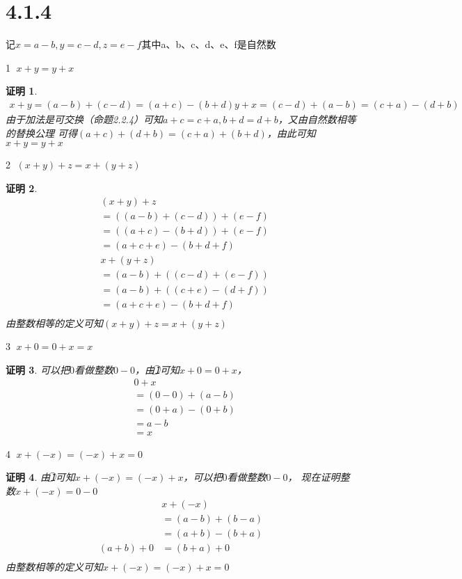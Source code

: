 \documentclass{article}
\theoremstyle{mystyle}
\theoremstyle{zproofstyle}
\newtheorem*{zproof}{证明}
\begin{document}
\section*{4.1.4}
记$x = a - b, y = c - d, z = e - f$其中a、b、c、d、e、f是自然数

\textcircled{1} $x + y = y + x$

\begin{zproof}
  \begin{align*}
    x + y
    = (a-b)+(c-d)
    = (a+c) - (b+d)
    y + x
    =(c-d)+(a-b)
    =(c+a) - (d+b)
  \end{align*}
  由于加法是可交换（命题2.2.4）可知$a+c=c+a,b+d=d+b$，又由自然数相等的替换公理
  可得$(a+c) + (d+b) = (c+a) + (b+d)$，由此可知$x + y = y + x$
\end{zproof}

\textcircled{2} $(x+y)+z=x+(y+z)$

\begin{zproof}
  \begin{align*}
     & (x+y)+z               \\
     & = ((a-b)+(c-d))+(e-f) \\
     & = ((a+c)-(b+d))+(e-f) \\
     & = (a+c+e) - (b+d+f)   \\
     & x+(y+z)               \\
     & = (a-b)+((c-d)+(e-f)) \\
     & = (a-b)+((c+e)-(d+f)) \\
     & = (a+c+e) - (b+d+f)   \\
  \end{align*}
  由整数相等的定义可知$(x+y)+z=x+(y+z)$

\end{zproof}

\textcircled{3} $x+0=0+x=x$

\begin{zproof}
  可以把$0$看做整数$0-0$，由\textcircled{1}可知$x+0=0+x$，
  \begin{align*}
     & 0+x           \\
     & = (0-0)+(a-b) \\
     & = (0+a)-(0+b) \\
     & = a-b         \\
     & = x
  \end{align*}
\end{zproof}

\textcircled{4} $x+(-x)=(-x)+x=0$

\begin{zproof}
  由\textcircled{1}可知$x+(-x)=(-x)+x$，可以把$0$看做整数$0-0$，
  现在证明整数$x+(-x)=0-0$
  \begin{align*}
              & x + (-x)        \\
              & = (a-b) + (b-a) \\
              & = (a+b) - (b+a) \\
    (a+b) + 0 & = (b+a) + 0     \\
  \end{align*}
  由整数相等的定义可知$x+(-x)=(-x)+x=0$
\end{zproof}
\end{document}
